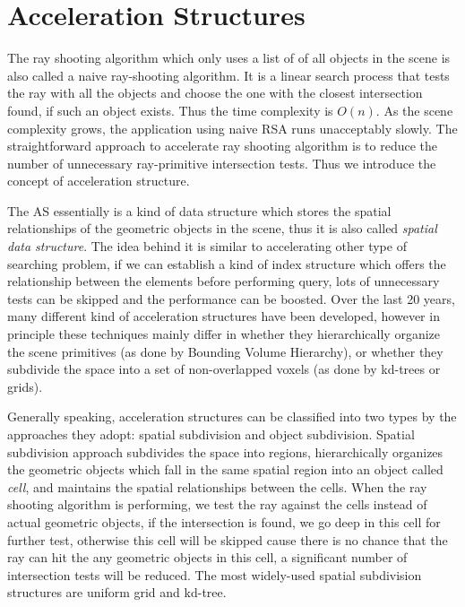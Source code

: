 \newpage

\section{Acceleration Structures}
The ray shooting algorithm which only uses a list of of all objects in the scene is also called a naive ray-shooting algorithm. It is a linear search process that tests the ray with all the objects and choose the one with the closest intersection found, if such an object exists. Thus the time complexity is \( O(n) \). As the scene complexity grows, the application using naive RSA runs unacceptably slowly. The straightforward approach to accelerate ray shooting algorithm is to reduce the number of unnecessary ray-primitive intersection tests. Thus we introduce the concept of acceleration structure.

The AS essentially is a kind of data structure which stores the spatial relationships of the geometric objects in the scene, thus it is also called \emph{spatial data structure}. The idea behind it is similar to accelerating other type of searching problem, if we can establish a kind of index structure which offers the relationship between the elements before performing query, lots of unnecessary tests can be skipped and the performance can be boosted. Over the last 20 years, many different kind of acceleration structures have been developed, however in principle these techniques mainly differ in whether they hierarchically organize the scene primitives (as done by Bounding Volume Hierarchy), or whether they subdivide the space into a set of non-overlapped voxels (as done by kd-trees or grids).  

Generally speaking, acceleration structures can be classified into two types by the approaches they adopt: spatial subdivision and object subdivision. Spatial subdivision approach subdivides the space into regions, hierarchically organizes the geometric objects which fall in the same spatial region into an object called \emph{cell}, and maintains the spatial relationships between the cells. When the ray shooting algorithm is performing, we test the ray against the cells instead of actual geometric objects, if the intersection is found, we go deep in this cell for further test, otherwise this cell will be skipped cause there is no chance that the ray can hit the any geometric objects in this cell, a significant number of intersection tests will be reduced. The most widely-used spatial subdivision structures are uniform grid and kd-tree. 

